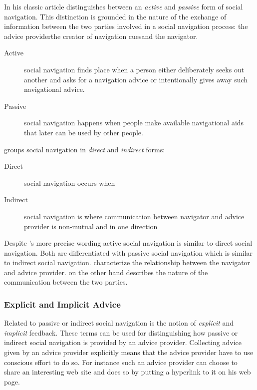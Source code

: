 In his classic article \citet{dieberger97} distinguishes between an
\emph{active} and \emph{passive} form of social navigation. This distinction
is grounded in the nature of the exchange of information between the two
parties involved in a social navigation process: the advice
provider\dash{}the creator of navigation cues\dash{}and the navigator.

\begin{description}
  \item[Active] social navigation finds place when a person either
    deliberately seeks out another and asks for a navigation advice or
    intentionally gives away such navigational advice.
  \item[Passive] social navigation happens when people make available
    navigational aids that later can be used by other people.
\end{description}

\citeauthor{svensson03} groups social navigation in \emph{direct}
and \emph{indirect} forms:

\begin{description}
  \item[Direct] social navigation occurs when
  \item[Indirect] social navigation is where
    \citep[p.~21]{svensson03}{%
      communication between navigator and advice provider
      is non-mutual and in one direction}
\end{description}

Despite \citeauthor{svensson03}'s more precise wording active social
navigation is similar to direct social navigation. Both are differentiated
with passive social navigation which is similar to indirect social navigation.
\citeauthor{dieberger97} characterize the relationship between the
navigator and advice provider. \citeauthor{svensson03} on the other hand
describes the nature of the communication between the two parties.

\subsubsection{Explicit and Implicit Advice}

Related to passive or indirect social navigation is the notion
of \emph{explicit} and \emph{implicit} feedback.
These terms can be used for distinguishing how
passive or indirect social navigation is provided by an advice provider.
Collecting advice given by an advice provider explicitly means that
the advice provider have to use conscious effort to do so. For instance such
an advice provider can choose to share an interesting web site and does so by
putting a hyperlink to it on his web page.

